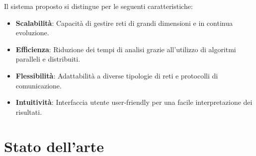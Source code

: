 \documentclass[target=bach,aauheader=,style=]{thud}
\begin{document}
Il sistema proposto si distingue per le seguenti caratteristiche:

\begin{itemize}
  \item \textbf{Scalabilità}: Capacità di gestire reti di grandi dimensioni e in continua evoluzione.

  \item \textbf{Efficienza}: Riduzione dei tempi di analisi grazie all'utilizzo di algoritmi paralleli e distribuiti.
    
  \item \textbf{Flessibilità}: Adattabilità a diverse tipologie di reti e protocolli di comunicazione.

  \item \textbf{Intuitività}: Interfaccia utente user-friendly per una facile interpretazione dei risultati.
\end{itemize}

%
%

\chapter{Stato dell'arte}
\label{art}
\end{document}
